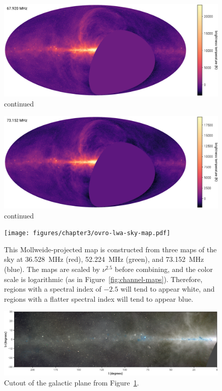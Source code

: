 \begin{bibunit}
\addtocounter{figure}{-1}
\begin{figure}
    \centering
    \includegraphics[width=\textwidth]{figures/chapter3/spw16}
    \caption{
        continued
    }
\end{figure}

\addtocounter{figure}{-1}
\begin{figure}
    \centering
    \includegraphics[width=\textwidth]{figures/chapter3/spw18}
    \caption{
        continued
    }
\end{figure}

\begin{figure}
    \centering
    \texttt{[image: figures/chapter3/ovro-lwa-sky-map.pdf]}
    \caption{
        This Mollweide-projected map is constructed from three maps of the sky at 36.528~MHz (red),
        52.224~MHz (green), and 73.152~MHz (blue). The maps are scaled by $\nu^{2.5}$ before
        combining, and the color scale is logarithmic (as in Figure~\ref{fig:channel-maps}).
        Therefore, regions with a spectral index of $-2.5$ will tend to appear white, and regions
        with a flatter spectral index will tend to appear blue.
    }
    \label{fig:three-color}
\end{figure}

\begin{figure}
    \centering
    \includegraphics[width=\textwidth]{figures/chapter3/ovro-lwa-galactic-plane.pdf}
    \caption{
        Cutout of the galactic plane from Figure~\ref{fig:three-color}.
    }
    \label{fig:galactic-plane-cutout}
\end{figure}


\end{bibunit}
